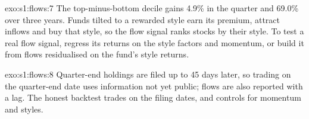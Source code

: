 \begin{solution}{exo:s1:flows:7}
The top-minus-bottom decile gains 4.9\% in the quarter and 69.0\% over three years. Funds tilted to a rewarded style earn its premium, attract inflows and
buy that style, so the flow signal ranks stocks by their style. To test a real flow signal, regress its returns on the style factors and momentum, or
build it from flows residualised on the fund's style returns.
\end{solution}

\begin{solution}{exo:s1:flows:8}
Quarter-end holdings are filed up to 45 days later, so trading on the quarter-end date uses information not yet public; flows are also reported with a lag.
The honest backtest trades on the filing dates, and controls for momentum and styles.
\end{solution}

